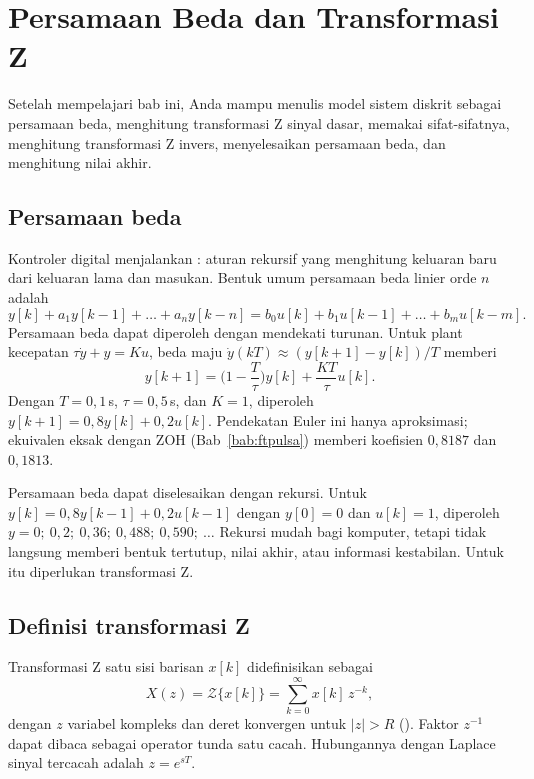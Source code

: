 \chapter{Persamaan Beda dan Transformasi Z}
\label{bab:z}

\begin{tujuan}
	Setelah mempelajari bab ini, Anda mampu menulis model sistem diskrit sebagai persamaan beda, menghitung transformasi Z sinyal dasar, memakai sifat-sifatnya, menghitung transformasi Z invers, menyelesaikan persamaan beda, dan menghitung nilai akhir.
\end{tujuan}

\section{Persamaan beda}
Kontroler digital menjalankan : aturan rekursif yang menghitung keluaran baru dari keluaran lama dan masukan. Bentuk umum persamaan beda linier orde $n$ adalah
\begin{equation}
	y[k] + a_1y[k-1] + \dots + a_ny[k-n] = b_0u[k] + b_1u[k-1] + \dots + b_mu[k-m].
\end{equation}
Persamaan beda dapat diperoleh dengan mendekati turunan. Untuk plant kecepatan $\tau\dot y + y = Ku$, beda maju $\dot y(kT) \approx (y[k+1]-y[k])/T$ memberi
\begin{equation}
	y[k+1] = \Big(1 - \frac{T}{\tau}\Big)y[k] + \frac{KT}{\tau}u[k].
\end{equation}
Dengan $T=0{,}1$\,s, $\tau=0{,}5$\,s, dan $K=1$, diperoleh $y[k+1] = 0{,}8y[k] + 0{,}2u[k]$. Pendekatan Euler ini hanya aproksimasi; ekuivalen eksak dengan ZOH (Bab~\ref{bab:ftpulsa}) memberi koefisien $0{,}8187$ dan $0{,}1813$.

Persamaan beda dapat diselesaikan dengan rekursi. Untuk $y[k] = 0{,}8y[k-1] + 0{,}2u[k-1]$ dengan $y[0]=0$ dan $u[k]=1$, diperoleh $y = 0;\ 0{,}2;\ 0{,}36;\ 0{,}488;\ 0{,}590;\ \dots$ Rekursi mudah bagi komputer, tetapi tidak langsung memberi bentuk tertutup, nilai akhir, atau informasi kestabilan. Untuk itu diperlukan transformasi Z.

\section{Definisi transformasi Z}
Transformasi Z satu sisi barisan $x[k]$ didefinisikan sebagai
\begin{equation}
	X(z) = \mathcal{Z}\{x[k]\} = \sum_{k=0}^{\infty}x[k]\,z^{-k},
\end{equation}
dengan $z$ variabel kompleks dan deret konvergen untuk $|z| > R$ (). Faktor $z^{-1}$ dapat dibaca sebagai operator tunda satu cacah. Hubungannya dengan Laplace sinyal tercacah adalah $z = e^{sT}$.

